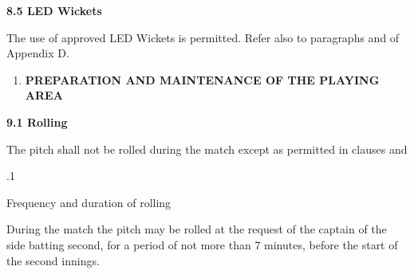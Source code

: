 \documentclass[12pt]{article}
\begin{document}
\vspace{\baselineskip}
{\fontsize{11pt}{13.2pt}\selectfont \textbf{8.5 \tabto{0.47in} LED Wickets}\par}\par


\vspace{\baselineskip}
{\fontsize{9pt}{10.8pt}\selectfont The use of approved LED Wickets is permitted. Refer also to paragraphs and of Appendix D.\par}\par


\vspace{\baselineskip}
\begin{enumerate}[label*={\fontsize{16pt}{16pt}\selectfont \textbf{\arabic*.}}]
	\item {\fontsize{16pt}{19.2pt}\selectfont \textbf{PREPARATION AND MAINTENANCE OF THE PLAYING AREA}\par}
\end{enumerate}\par


\vspace{\baselineskip}
{\fontsize{11pt}{13.2pt}\selectfont \textbf{9.1 \tabto{0.47in} Rolling}\par}\par


\vspace{\baselineskip}
{\fontsize{9pt}{10.8pt}\selectfont The pitch shall not be rolled during the match except as permitted in clauses and \par}\par


\vspace{\baselineskip}
{\fontsize{9pt}{10.8pt}.1 \tabto{0.49in} {\fontsize{8pt}{9.6pt}\selectfont Frequency and duration of rolling\par}\par}\par


\vspace{\baselineskip}
\begin{adjustwidth}{0.5in}{0.01in}
{\fontsize{9pt}{10.8pt}\selectfont During the match the pitch may be rolled at the request of the captain of the side batting second, for a period of not more than 7 minutes, before the start of the second innings.\par}\par

\end{adjustwidth}
\end{document}
